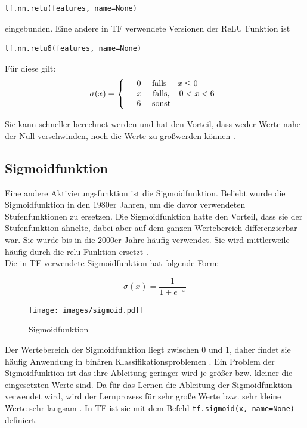 \vspace{0.3cm}
\begin{lstlisting}
tf.nn.relu(features, name=None)
\end{lstlisting} 

eingebunden. Eine andere in \gls{TF} verwendete Versionen der \gls{ReLU} Funktion ist \cite{cookbook}

\vspace{0.3cm}
\begin{lstlisting}
tf.nn.relu6(features, name=None)
\end{lstlisting}
F\"ur diese gilt:
\begin{align*}
	\sigma(x)=
	\left\{
	\begin{array}{l l}
		& 0 \quad \text{   falls  } \quad x \leq 0  \\ 
		& x \quad \text{   falls},\quad 0 < x < 6 \\
		& 6 \quad \text{   sonst}
	\end{array}
	\right.
\end{align*}

Sie kann schneller berechnet werden und hat den Vorteil, dass weder Werte nahe der Null verschwinden, noch die Werte zu gro\ss werden k\"onnen \cite{cookbook}.


\subsection{Sigmoidfunktion}
Eine andere Aktivierungsfunktion ist die Sigmoidfunktion. Beliebt wurde die Sigmoidfunktion in den 1980er Jahren, um die davor verwendeten Stufenfunktionen zu ersetzen. Die Sigmoidfunktion hatte den Vorteil, dass sie der Stufenfunktion ähnelte, dabei aber auf dem ganzen Wertebereich differenzierbar war. Sie wurde bis in die 2000er Jahre häufig verwendet. Sie wird mittlerweile häufig durch die relu Funktion ersetzt \cite{Goodfellow}. \\
Die in \gls{TF} verwendete Sigmoidfunktion hat folgende Form: \cite{cookbook}

\begin{equation}
\sigma(x)=\frac{1}{1+e^{-x}}
\end{equation}

\begin{figure}[!htp]
	\centering
	\texttt{[image: images/sigmoid.pdf]}
	\caption{Sigmoidfunktion \cite{building}}
\end{figure}


Der Wertebereich der Sigmoidfunktion liegt zwischen 0 und 1, daher findet sie häufig Anwendung in binären Klassifikationsproblemen \cite{Goodfellow}. Ein Problem der Sigmoidfunktion ist das ihre Ableitung geringer wird je größer bzw. kleiner die eingesetzten Werte sind. Da für das Lernen die Ableitung der Sigmoidfunktion verwendet wird, wird der Lernprozess für sehr große Werte bzw. sehr kleine Werte sehr langsam \cite{Goodfellow}. In \gls{TF} ist sie mit dem Befehl \lstinline$tf.sigmoid(x, name=None)$ \cite{building}
definiert.



